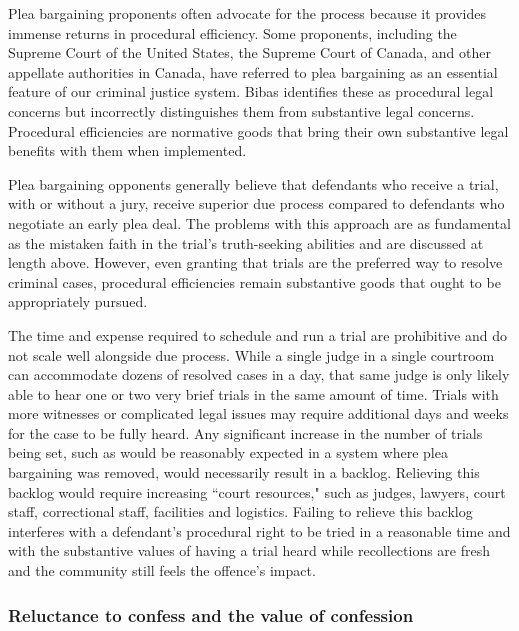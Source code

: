 Plea bargaining proponents often advocate for the process because it provides immense returns in procedural efficiency. Some proponents, including the Supreme Court of the United States, the Supreme Court of Canada, and other appellate authorities in Canada, have referred to plea bargaining as an essential feature of our criminal justice system. Bibas identifies these as procedural legal concerns but incorrectly distinguishes them from substantive legal concerns. Procedural efficiencies are normative goods that bring their own substantive legal benefits with them when implemented. 

Plea bargaining opponents generally believe that defendants who receive a trial, with or without a jury, receive superior due process compared to defendants who negotiate an early plea deal. The problems with this approach are as fundamental as the mistaken faith in the trial's truth-seeking abilities and are discussed at length above. However, even granting that trials are the preferred way to resolve criminal cases, procedural efficiencies remain substantive goods that ought to be appropriately pursued. 

The time and expense required to schedule and run a trial are prohibitive and do not scale well alongside due process. While a single judge in a single courtroom can accommodate dozens of resolved cases in a day, that same judge is only likely able to hear one or two very brief trials in the same amount of time. Trials with more witnesses or complicated legal issues may require additional days and weeks for the case to be fully heard. Any significant increase in the number of trials being set, such as would be reasonably expected in a system where plea bargaining was removed, would necessarily result in a backlog. Relieving this backlog would require increasing ``court resources," such as judges, lawyers, court staff, correctional staff, facilities and logistics. Failing to relieve this backlog interferes with a defendant's procedural right to be tried in a reasonable time and with the substantive values of having a trial heard while recollections are fresh and the community still feels the offence's impact. 

\subsubsection{Reluctance to confess and the value of confession}

